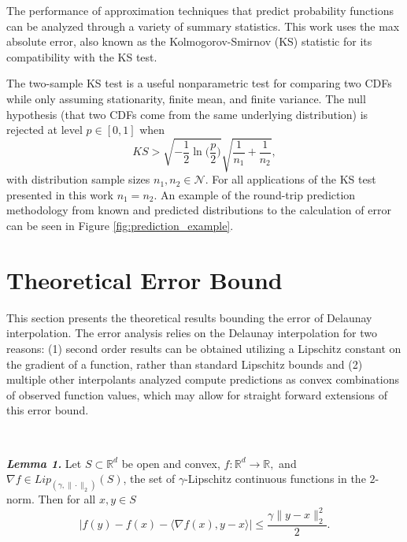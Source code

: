 \documentclass[smallextended]{svjour3}       %
\begin{document}

The performance of approximation techniques that predict probability functions can be analyzed through a variety of summary statistics. This work uses the max absolute error, also known as the Kolmogorov-Smirnov (KS) statistic \cite{lilliefors1967kolmogorov} for its compatibility with the KS test.

The two-sample KS test is a useful nonparametric test for comparing two CDFs while only assuming stationarity, finite mean, and finite variance. The null hypothesis (that two CDFs come from the same underlying distribution) is rejected at level $p \in [0,1]$ when
$$ KS > \sqrt{-\frac{1}{2}\ln\biggl(\frac{p}{2}\biggr)} \sqrt{\frac{1}{n_1} + \frac{1}{n_2}}, $$
with distribution sample sizes $n_1,n_2 \in \mathcal{N}$. For all applications of the KS test presented in this work $n_1 = n_2$. An example of the round-trip prediction methodology from known and predicted distributions to the calculation of error can be seen in Figure \ref{fig:prediction_example}.

\section{Theoretical Error Bound}

This section presents the theoretical results bounding the error of Delaunay interpolation. The error analysis relies on the Delaunay interpolation for two reasons: (1) second order results can be obtained utilizing a Lipschitz constant on the gradient of a function, rather than standard Lipschitz bounds and (2) multiple other interpolants analyzed compute predictions as convex combinations of observed function values, which may allow for straight forward extensions of this error bound.

$ $

\noindent \textbf{\textit{Lemma 1.}} Let $S \subset \mathbb{R}^d$ be open and convex, $f: \mathbb{R}^d \rightarrow \mathbb{R},$ and $\nabla f \in Lip_{(\gamma,\|\cdot\|_2)}(S)$, the set of $\gamma$-Lipschitz continuous functions in the $2$-norm. Then for all $x,y \in S$
%
$$\big|f(y) - f(x) - \langle \nabla f(x), y - x \rangle \big| \leq \frac{\gamma \|y - x\|_2^2}{2}.$$
\end{document}

